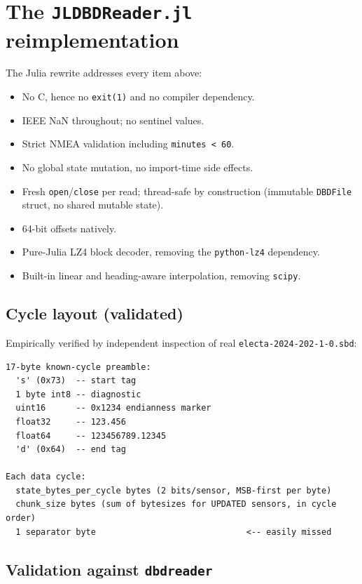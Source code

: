 \documentclass[11pt]{article}
\begin{document}
\section{The \texttt{JLDBDReader.jl} reimplementation}

The Julia rewrite addresses every item above:

\begin{itemize}[leftmargin=*,topsep=1pt,itemsep=0pt]
  \item No C, hence no \texttt{exit(1)} and no compiler dependency.
  \item IEEE NaN throughout; no sentinel values.
  \item Strict NMEA validation including \texttt{minutes < 60}.
  \item No global state mutation, no import-time side effects.
  \item Fresh \texttt{open}/\texttt{close} per read; thread-safe by construction
        (immutable \texttt{DBDFile} struct, no shared mutable state).
  \item 64-bit offsets natively.
  \item Pure-Julia LZ4 block decoder, removing the \texttt{python-lz4} dependency.
  \item Built-in linear and heading-aware interpolation, removing \texttt{scipy}.
\end{itemize}

\subsection{Cycle layout (validated)}

Empirically verified by independent inspection of real \texttt{electa-2024-202-1-0.sbd}:

\begin{lstlisting}
17-byte known-cycle preamble:
  's' (0x73)  -- start tag
  1 byte int8 -- diagnostic
  uint16      -- 0x1234 endianness marker
  float32     -- 123.456
  float64     -- 123456789.12345
  'd' (0x64)  -- end tag

Each data cycle:
  state_bytes_per_cycle bytes (2 bits/sensor, MSB-first per byte)
  chunk_size bytes (sum of bytesizes for UPDATED sensors, in cycle order)
  1 separator byte                              <-- easily missed
\end{lstlisting}

\subsection{Validation against \texttt{dbdreader}}
\end{document}
